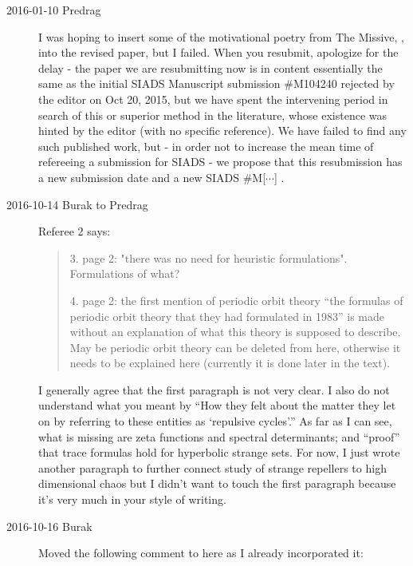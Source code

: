 \begin{description}
\item[2016-01-10 Predrag]
I was hoping to insert some of the motivational poetry from The Missive,
, into the revised paper, but I failed. When you
resubmit, apologize for the delay - the paper we are resubmitting now is
in content essentially the same as the initial SIADS Manuscript
submission \#M104240 rejected by the editor on Oct 20, 2015, but we have
spent the intervening period in search of this or superior method in the
literature, whose existence was hinted by the editor (with no specific
reference). We have failed to find any such published work, but - in
order not to increase the mean time of refereeing a submission for SIADS
- we propose that this resubmission has a new submission date and a new
SIADS \#M[$\cdots$] .

\item[2016-10-14 Burak to Predrag]
Referee 2 says:

\begin{quote}
3. page 2: "there was no need for heuristic formulations".
Formulations of what?

4. page 2: the first mention of periodic orbit theory
``the formulas of periodic orbit theory that they had formulated in 1983''
is made without an explanation of what this theory is supposed to
describe. May be periodic orbit theory can be deleted from here,
otherwise it needs to be explained here (currently it is done later
in the text).
\end{quote}

I generally agree that the first paragraph is not very clear. I also
do not understand what you meant by
``How they felt about the matter they let on by
referring to these entities as `repulsive cycles'.''
As far as I can see, what  is missing are zeta functions and
spectral determinants; and ``proof'' that trace formulas hold for
hyperbolic strange sets. For now, I just wrote another paragraph to
further connect study of strange repellers to high dimensional chaos
but I didn't want to touch the first paragraph because it's very
much in your style of writing.

\item[2016-10-16 Burak] Moved the following comment to here as I already
incorporated it:



\end{description}

